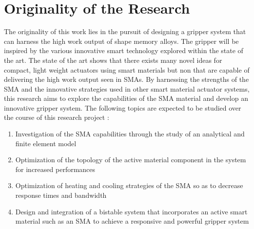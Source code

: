 \section{Originality of the Research} \label{sec:originality}
The originality of this work lies in the pursuit of designing a gripper system that can harness the high work output of shape memory alloys. The gripper will be inspired by the various innovative smart technology explored within the state of the art. The state of the art shows that there exists many novel ideas for compact, light weight actuators using smart materials but non that are capable of delivering the high work output seen in SMAs. By harnessing the strengths of the SMA and the innovative strategies used in other smart material actuator systems, this research aims to explore the capabilities of the SMA material and develop an innovative gripper system. The following topics are expected to be studied over the course of this research project :
\begin{enumerate}
  \item Investigation of the SMA capabilities through the study of an analytical and finite element model
  \item Optimization of the topology of the active material component in the system for increased performances
  \item Optimization of heating and cooling strategies of the SMA so as to decrease response times and bandwidth
  \item Design and integration of a bistable system that incorporates an active smart material such as an SMA to achieve a responsive and powerful gripper system
\end{enumerate}
